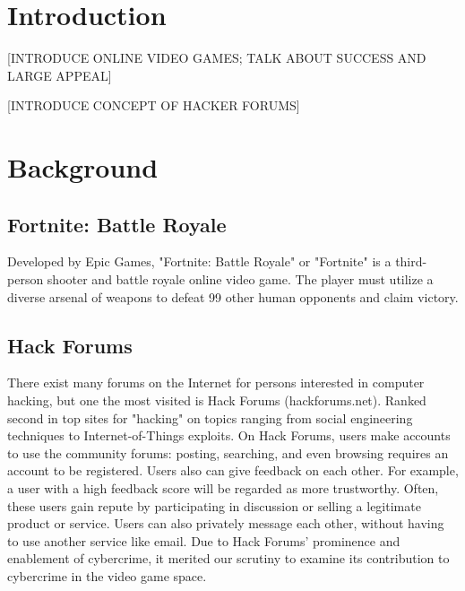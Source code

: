\documentclass[sigconf]{acmart}
\begin{document}


\maketitle

\section{Introduction}

[INTRODUCE ONLINE VIDEO GAMES; TALK ABOUT SUCCESS AND LARGE APPEAL]

[INTRODUCE CONCEPT OF HACKER FORUMS]

\section{Background}

\subsection{Fortnite: Battle Royale}
Developed by Epic Games, "Fortnite: Battle Royale" or "Fortnite" is a 
third-person shooter and battle royale online video game. The player must
utilize a diverse arsenal of weapons to defeat 99 other human opponents and 
claim victory. 

\subsection{Hack Forums}
There exist many forums on the Internet for persons interested in computer
hacking, but one the most visited is Hack Forums (hackforums.net). Ranked
second in top sites for "hacking" %
on topics ranging from social engineering techniques to Internet-of-Things 
exploits. On Hack Forums, users make accounts to use the community forums:
posting, searching, and even browsing requires an account to be registered.
Users also can give feedback on each other. For example, a user with
a high feedback score will be regarded as more trustworthy. Often, these users
gain repute by participating in discussion or selling a legitimate product or 
service. Users can also privately message each other, without having to use
another service like email. Due to Hack Forums' prominence and enablement of 
cybercrime, it merited our scrutiny to examine its contribution to cybercrime
in the video game space. 
\end{document}
